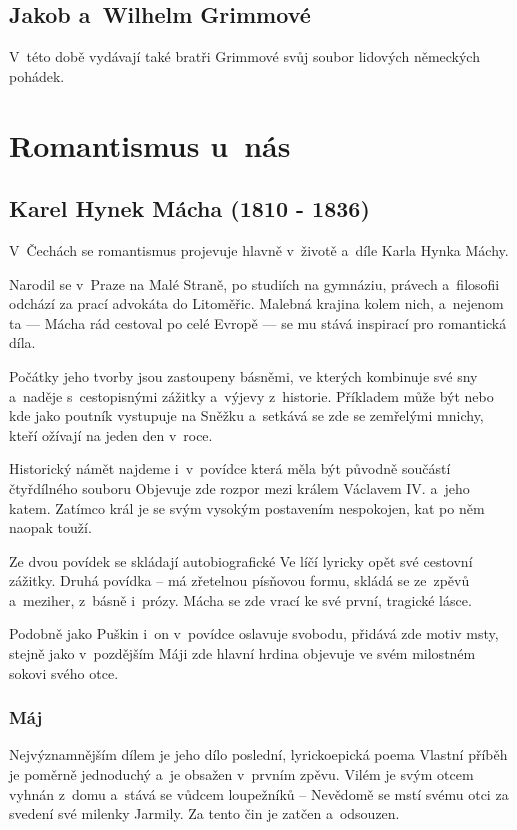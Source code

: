 \subsection*{Jakob a~Wilhelm Grimmové}
V~této době vydávají také bratři Grimmové svůj soubor lidových německých
pohádek.

\section{Romantismus u~nás}
\subsection*{Karel Hynek Mácha (1810 - 1836)}
V~Čechách se romantismus projevuje hlavně v~životě a~díle Karla Hynka
Máchy.

Narodil se v~Praze na Malé Straně, po studiích na gymnáziu, právech
a~filosofii odchází za prací advokáta do Litoměřic. Malebná krajina kolem
nich, a~nejenom ta --- Mácha rád cestoval po celé Evropě --- se mu stává
inspirací pro romantická díla.

Počátky jeho tvorby jsou zastoupeny básněmi, ve kterých kombinuje své
sny a~naděje s~cestopisnými zážitky a~výjevy z~historie. Příkladem může
být  nebo  kde jako poutník
vystupuje na Sněžku a~setkává se zde se zemřelými mnichy, kteří ožívají
na jeden den v~roce.

Historický námět najdeme i~v~povídce  která měla být
původně součástí čtyřdílného souboru  Objevuje zde rozpor
mezi králem Václavem IV. a~jeho katem. Zatímco král je se svým vysokým
postavením nespokojen, kat po něm naopak touží.

Ze dvou povídek se skládají autobiografické 
Ve  líčí lyricky opět své cestovní zážitky.
Druhá povídka --  má zřetelnou písňovou formu, skládá se
ze~zpěvů a~meziher, z~básně i~prózy. Mácha se zde vrací ke své první,
tragické lásce.

Podobně jako Puškin i~on v~povídce  oslavuje svobodu,
přidává zde motiv msty, stejně jako v~pozdějším Máji zde hlavní
hrdina objevuje ve svém milostném sokovi svého otce.

\subsubsection*{Máj}
Nejvýznamnějším dílem je jeho dílo poslední, lyrickoepická poema
 Vlastní příběh je poměrně jednoduchý a~je obsažen v~prvním
zpěvu. Vilém je svým otcem vyhnán z~domu a~stává se vůdcem loupežníků --
 Nevědomě se mstí svému otci za svedení své
milenky Jarmily. Za tento čin je zatčen a~odsouzen.

